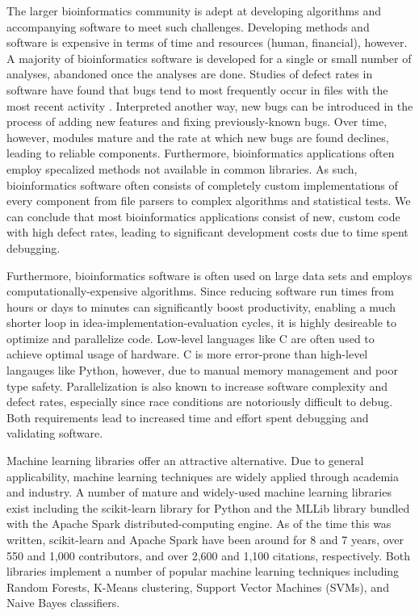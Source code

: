 The larger bioinformatics community is adept at developing algorithms and accompanying software to meet such challenges.  Developing methods and software is expensive in terms of time and resources (human, financial), however. A majority of bioinformatics software is developed for a single or small number of analyses, abandoned once the analyses are done. Studies of defect rates in software have found that bugs tend to most frequently occur in files with the most recent activity \cite{Ostrand2005}.  Interpreted another way, new bugs can be introduced in the process of adding new features and fixing previously-known bugs. Over time, however, modules mature and the rate at which new bugs are found declines, leading to reliable components. Furthermore, bioinformatics applications often employ specalized methods not available in common libraries.  As such, bioinformatics software often consists of completely custom implementations of every component from file parsers to complex algorithms and statistical tests.  We can conclude that most bioinformatics applications consist of new, custom code with high defect rates, leading to significant development costs due to time spent debugging.

Furthermore, bioinformatics software is often used on large data sets and employs computationally-expensive algorithms.  Since reducing software run times from hours or days to minutes can significantly boost productivity, enabling a much shorter loop in idea-implementation-evaluation cycles, it is highly desireable to optimize and parallelize code.  Low-level languages like C are often used to achieve optimal usage of hardware. C is more error-prone than high-level langauges like Python, however, due to manual memory management and poor type safety.  Parallelization is also known to increase software complexity and defect rates, especially since race conditions are notoriously difficult to debug. Both requirements lead to increased time and effort spent debugging and validating software.

Machine learning libraries offer an attractive alternative.  Due to general applicability, machine learning techniques are widely applied through academia and industry.  A number of mature and widely-used machine learning libraries exist including the scikit-learn \cite{scikit-learn} library for Python and the MLLib library bundled with the Apache Spark distributed-computing engine.  As of the time this was written, scikit-learn and Apache Spark have been around for 8 and 7 years, over 550 and 1,000 contributors, and over 2,600 and 1,100 citations, respectively. Both libraries implement a number of popular machine learning techniques including Random Forests, K-Means clustering, Support Vector Machines (SVMs), and Naive Bayes classifiers. 

